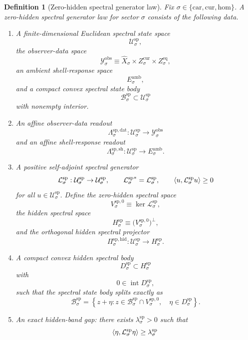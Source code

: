 \documentclass[11pt]{article}
\newcommand{\Car}{\mathrm{car}}
\newcommand{\Cur}{\mathrm{cur}}
\newcommand{\Hom}{\mathrm{hom}}
\newcommand{\VisibleAffine}[1]{\widehat X_{#1}}
\newcommand{\DataSpace}[1]{\mathcal Y_{#1}^{\mathrm{obs}}}
\newcommand{\AmbientTarget}[1]{E_{#1}^{\mathrm{amb}}}
\newcommand{\SpecSpace}[1]{\mathcal U_{#1}^{\mathrm{sp}}}
\newcommand{\SpecBody}[1]{\mathcal B_{#1}^{\mathrm{sp}}}
\newcommand{\SpecData}[1]{\Lambda_{#1}^{\mathrm{sp,dat}}}
\newcommand{\SpecShell}[1]{\Lambda_{#1}^{\mathrm{sp,sh}}}
\newcommand{\SpecOp}[1]{\mathcal L_{#1}^{\mathrm{sp}}}
\newcommand{\SpecZero}[1]{V_{#1}^{\mathrm{sp},0}}
\newcommand{\SpecHidden}[1]{H_{#1}^{\mathrm{sp}}}
\newcommand{\SpecHiddenBody}[1]{D_{#1}^{\mathrm{sp}}}
\newcommand{\SpecProj}[1]{\Pi_{#1}^{\mathrm{sp,hid}}}
\newtheorem{definition}{Definition}
\begin{document}
\begin{definition}[Zero-hidden spectral generator law]
\label{def:spectral}
Fix \(\sigma\in\{\Car,\Cur,\Hom\}\). A \emph{zero-hidden spectral generator law} for sector \(\sigma\) consists of the following data.
\begin{enumerate}
    \item A finite-dimensional Euclidean spectral state space
    \[
    \SpecSpace{\sigma},
    \]
    the observer-data space
    \[
    \DataSpace{\sigma}
    \equiv
    \VisibleAffine{\sigma}\times Z_{\sigma}^{\mathrm{cur}}\times Z_{\sigma}^{\mathrm{eq}},
    \]
    an ambient shell-response space
    \[
    \AmbientTarget{\sigma},
    \]
    and a compact convex spectral state body
    \[
    \SpecBody{\sigma}\subset\SpecSpace{\sigma}
    \]
    with nonempty interior.
    \item An affine observer-data readout
    \[
    \SpecData{\sigma}:\SpecSpace{\sigma}\to\DataSpace{\sigma}
    \]
    and an affine shell-response readout
    \[
    \SpecShell{\sigma}:\SpecSpace{\sigma}\to\AmbientTarget{\sigma}.
    \]
    \item A positive self-adjoint spectral generator
    \[
    \SpecOp{\sigma}:\SpecSpace{\sigma}\to\SpecSpace{\sigma},
    \qquad
    {\SpecOp{\sigma}}^{*}=\SpecOp{\sigma},
    \qquad
    \ev{u,\SpecOp{\sigma}u}\ge 0
    \]
    for all \(u\in\SpecSpace{\sigma}\). Define the zero-hidden spectral space
    \[
    \SpecZero{\sigma}\equiv\ker\SpecOp{\sigma},
    \]
    the hidden spectral space
    \[
    \SpecHidden{\sigma}
    \equiv
    \bigl(\SpecZero{\sigma}\bigr)^{\perp},
    \]
    and the orthogonal hidden spectral projector
    \[
    \SpecProj{\sigma}:\SpecSpace{\sigma}\to\SpecHidden{\sigma}.
    \]
    \item A compact convex hidden spectral body
    \[
    \SpecHiddenBody{\sigma}\subset\SpecHidden{\sigma}
    \]
    with
    \[
    0\in\operatorname{int}\SpecHiddenBody{\sigma},
    \]
    such that the spectral state body splits exactly as
    \begin{equation}
    \SpecBody{\sigma}
    =
    \left\{
    z+\eta:
    z\in\SpecBody{\sigma}\cap\SpecZero{\sigma},
    \quad
    \eta\in\SpecHiddenBody{\sigma}
    \right\}.
    \label{eq:specsplitting}
    \end{equation}
    \item An exact hidden-band gap: there exists \(\lambda_{\sigma}^{\mathrm{sp}}>0\) such that
    \begin{equation}
    \ev{\eta,\SpecOp{\sigma}\eta}
    \ge
    \lambda_{\sigma}^{\mathrm{sp}}\,

\end{equation}
\end{enumerate}
\end{definition}
\end{document}
